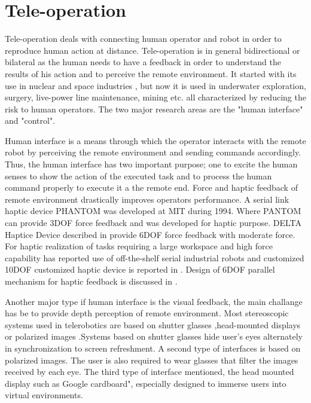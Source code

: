    
\section{Tele-operation}
Tele-operation deals with  connecting   human operator and robot in order to reproduce human action at distance. Tele-operation is in general bidirectional or bilateral as the human needs to have a feedback in order to understand the results of his action and to perceive the remote environment. It started with its use in nuclear and space industries \cite{martin1985teleoperated,vertut1986teleoperations}, but now it is used in underwater exploration, surgery, live-power line maintenance, mining etc. all characterized by reducing the risk to human operators. The two major research areas are the "human interface" and "control".

Human interface is a means through which the operator interacts with the remote robot by perceiving the remote environment and sending commands accordingly. Thus, the human interface has two important purpose; one to excite the human senses to show the action of the executed task and to process the human command properly to execute it a the remote end.  Force and haptic feedback of remote environment drastically improves operators performance. A serial link haptic device PHANTOM \cite{massie1994phantom} was developed at MIT during 1994. Where PANTOM can provide 3DOF force feedback and was developed for haptic purpose. DELTA Haptice Device described in \cite{grange2001overview} provide 6DOF force feedback with moderate force. For haptic realization of tasks requiring a large workspace and high force capability \cite{clover1997dynamic} has reported  use of off-the-shelf serial industrial robots  and customized 10DOF customized haptic device is reported in \cite{ueberle2004vishard10}. Design  of 6DOF parallel mechanism for haptic feedback is discussed in \cite{yoon2001design}.

Another major type if human interface is the visual feedback, the main challange has be to provide depth perception of remote environment. Most stereoscopic systems used in telerobotics are based on shutter glasses \cite{aracil1997telerobotic,matthies1992stereo},head-mounted displays \cite{matthies1992stereo} or polarized images \cite{hirzinger1994robots}.Systems based on shutter glasses hide user’s eyes alternately in synchronization to screen refreshment. A second type of interfaces is based on polarized images. The user is also required to wear glasses that filter the images received by each eye. The third type of interface mentioned, the head mounted display such as Google cardboard",  especially designed to immerse users into virtual environments.


